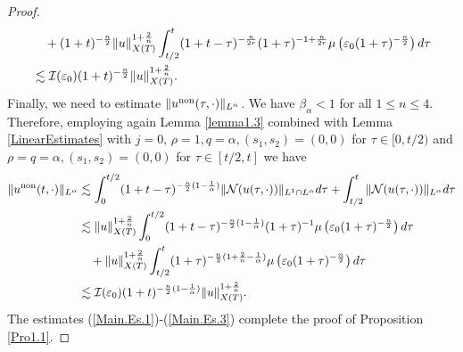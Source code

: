 \documentclass[11pt,reqno]{amsart}
\begin{document}
\begin{proof}
\begin{align}
       &\quad + (1+t)^{-\frac{n}{2}} \|u\|_{X(T)}^{1+\frac{2}{n}} \int_{t/2}^t (1+t-\tau)^{-\frac{n}{2r}} (1+\tau)^{-1+\frac{n}{2r}}  \mu\left(\varepsilon_0 (1+\tau)^{-\frac{n}{2}}\right) d\tau \notag\\
       &\lesssim \mathcal{I}(\varepsilon_0) (1+t)^{-\frac{n}{2}} \|u\|_{X(T)}^{1+\frac{2}{n}}. \label{Main.Es.2}
   \end{align}
   Finally, we need to estimate $\|u^{\rm non}(\tau,\cdot)\|_{L^{\alpha}}$. We have $\beta_\alpha < 1$ for all $1 \leq n \leq 4$. Therefore, employing again Lemma \ref{lemma1.3} combined with Lemma \ref{LinearEstimates} with $j = 0, \,\rho = 1, q =\alpha, (s_1, s_2) = (0,0)$ for $\tau \in [0, t/2)$ and $\rho = q =\alpha, (s_1, s_2) = (0,0)$ for $\tau \in [t/2, t]$ we have
   \begin{align}
       \|u^{\rm non}(t,\cdot)\|_{L^\alpha} &\lesssim \int_0^{t/2} (1+t-\tau)^{-\frac{n}{2}(1-\frac{1}{\alpha})} \|\mathcal{N}(u(\tau,\cdot))\|_{L^1 \cap L^\alpha} d\tau  +\int_{t/2}^t \|\mathcal{N}(u(\tau,\cdot))\|_{L^{\alpha}} d\tau \notag\\
       &\lesssim \|u\|_{X(T)}^{1+\frac{2}{n}} \int_0^{t/2} (1+t-\tau)^{-\frac{n}{2}(1-\frac{1}{\alpha})} (1+\tau)^{-1} \mu\left(\varepsilon_0 (1+\tau)^{-\frac{n}{2}}\right) d\tau \notag\\
       &\quad+ \|u\|_{X(T)}^{1+\frac{2}{n}}\int_{t/2}^t (1+\tau)^{-\frac{n}{2}(1+\frac{2}{n}-\frac{1}{\alpha})} \mu\left(\varepsilon_0 (1+\tau)^{-\frac{n}{2}}\right) d\tau \notag\\
       &\lesssim \mathcal{I}(\varepsilon_0) (1+t)^{-\frac{n}{2}(1-\frac{1}{\alpha})} \|u\|_{X(T)}^{1+\frac{2}{n}}. \label{Main.Es.3}
   \end{align}
   The estimates (\ref{Main.Es.1})-(\ref{Main.Es.3}) complete the proof of Proposition \ref{Pro1.1}.
     \end{proof}
\end{document}

